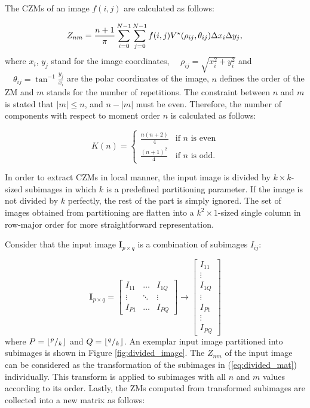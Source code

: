 \documentclass[]{spie}  %
\DeclarePairedDelimiter\floor{\lfloor}{\rfloor}
\begin{document}
The CZMs of an image $f(i,j)$ are calculated as follows:

\begin{equation}
\label{eq:global_zernike}
Z_{nm} = \frac{n+1}{\pi}\sum^{N-1}_{i=0}\sum^{N-1}_{j=0}f(i,j)V^\star(\rho_{ij},\theta_{ij})\Delta
x_i\Delta y_j, \\
\end{equation}
where $x_i$, $y_j$ stand for the image coordinates, $\quad\rho_{ij}=\sqrt{x_i^2+y_i^2}$ and $\quad\theta_{ij} = \tan^{-1}\frac{y_j}{x_i}$ are the polar coordinates of the image, $n$ defines the order of the ZM and $m$ stands for the number of repetitions. The constraint between $n$ and $m$ is stated that $|m|\leq n$, and $n-|m|$ must be even. Therefore, the number of components with respect to moment order $n$ is calculated as follows:

\begin{equation}
K(n) =
\begin{cases}
  \frac{n(n+2)}{4} &\text{if $n$ is even} \\ 
  \frac{(n+1)^2}{4} &\text{if $n$ is odd}.
\end{cases}
\label{eq:num_moms}
\end{equation}

In order to extract CZMs in local manner, the input image is divided by $k\times k$-sized subimages in which $k$ is a predefined partitioning parameter. If the image is not divided by $k$ perfectly, the rest of the part is simply ignored. The set of images obtained from partitioning are flatten into a  $k^2\times 1$-sized single column in row-major order for more straightforward representation.

Consider that the input image $\mathbf{I}_{p\times q}$ is a combination of subimages $I_{ij}$:

\begin{equation}
\mathbf{I}_{p\times q} = \begin{bmatrix}
 I_{11} & \hdots & I_{1Q} \\
 \vdots & \ddots & \vdots \\
 I_{P1} & \hdots & I_{PQ} 
 \end{bmatrix}
 \longrightarrow
 \begin{bmatrix}
 I_{11} \\
 \vdots \\
 I_{1Q} \\
 \vdots \\
 I_{P1} \\
 \vdots \\
 I_{PQ}
 \end{bmatrix}
 \label{eq:divided_mat}
\end{equation}
where $P=\floor*{^p/_k}$ and $Q=\floor*{^q/_k}$. An exemplar input image partitioned into subimages is shown in Figure \ref{fig:divided_image}. The $Z_{nm}$ of the input image can be considered as the transformation of the subimages in (\ref{eq:divided_mat}) individually. This transform is applied to subimages with all $n$ and $m$ values according to its order. Lastly, the ZMs computed from transformed subimages are collected into a new matrix as follows:
\end{document}
